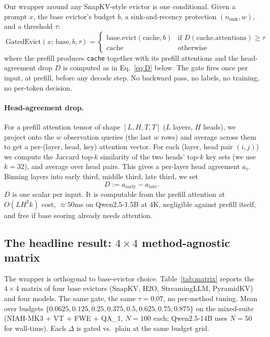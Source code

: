 \documentclass{article} %
\begin{document}
Our wrapper around any SnapKV-style evictor is one conditional. Given a prompt
$x$, the base evictor's budget $b$, a sink-and-recency protection
$(n_{\text{sink}}, w)$, and a threshold $\tau$:
\begin{equation}
\boxed{\
\text{GatedEvict}(x;\, \text{base}, b, \tau) =
\begin{cases}
\text{base.evict}(\text{cache}, b) & \text{if } D(\text{cache}.\text{attentions}) \ge \tau \\
\text{cache} & \text{otherwise}
\end{cases}\
}
\end{equation}
where the prefill produces \texttt{cache} together with its prefill attentions
and the head-agreement drop $D$ is computed as in Eq.~\eqref{eq:D} below.
The gate fires once per input, at prefill, before any decode step. No backward
pass, no labels, no training, no per-token decision.

\paragraph{Head-agreement drop.} For a prefill attention tensor of shape
$[L, H, T, T]$ ($L$ layers, $H$ heads), we project onto the $w$ observation
queries (the last $w$ rows) and average across them to get a per-(layer, head,
key) attention vector. For each (layer, head pair $(i, j)$) we compute the
Jaccard top-$k$ similarity of the two heads' top-$k$ key sets (we use $k = 32$),
and average over head pairs. This gives a per-layer head agreement
$a_\ell$. Binning layers into early third, middle third, late third, we set
\begin{equation}
\label{eq:D}
D := a_{\text{early}} - a_{\text{late}}.
\end{equation}
$D$ is one scalar per input. It is computable from the prefill attention at
$O(L H^2 k)$ cost, $\approx 50$ms on Qwen2.5-1.5B at 4K, negligible against
prefill itself, and free if base scoring already needs attention.

\subsection{The headline result: $4 \times 4$ method-agnostic matrix}
\label{subsec:matrix}

The wrapper is orthogonal to base-evictor choice. Table~\ref{tab:matrix} reports
the $4 \times 4$ matrix of four base evictors (SnapKV, H2O, StreamingLLM,
PyramidKV) and four models. The same gate, the same $\tau = 0.07$, no per-method
tuning. Mean over budgets $\{0.0625, 0.125, 0.25, 0.375, 0.5, 0.625, 0.75,
0.875\}$ on the mixed-suite (NIAH-MK3 + VT + FWE + QA\_1, $N = 100$ each;
Qwen2.5-14B uses $N = 50$ for wall-time). Each $\Delta$ is gated vs.\ plain at
the same budget grid.
\end{document}
